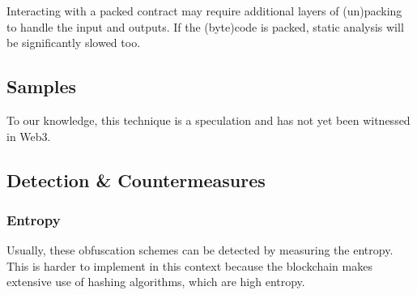 Interacting with a packed contract may require additional layers of (un)packing to handle the input and outputs.
If the (byte)code is packed, static analysis will be significantly slowed too.

\subsection{Samples}

To our knowledge, this technique is a speculation and has not yet been witnessed in Web3.

\subsection{Detection \& Countermeasures}

\subsubsection{Entropy}

Usually, these obfuscation schemes can be detected by measuring the entropy.
This is harder to implement in this context because the blockchain makes extensive use of hashing algorithms, which are high entropy.

